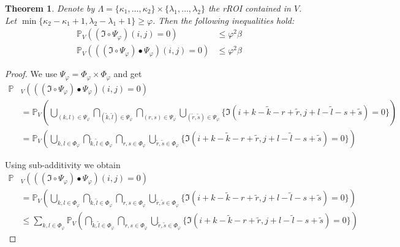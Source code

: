 \documentclass[a4paper,12pt]{article}
\theoremstyle{plain}
\newtheorem{theorem}{Theorem}[section]
\theoremstyle{definition}
\begin{document}
\begin{appendix}
\begin{theorem}
		Denote by $\varLambda = \{ \kappa_1, \dots, \kappa_2 \} \times \{ \lambda_1, \dots, \lambda_2 \}$ the rROI contained in $V$. Let $\min \{ \kappa_2 - \kappa_1 + 1, \lambda_2 - \lambda_1 + 1 \} \geq \varphi$.
		Then the following inequalities hold:
		\begin{align}
			\mathbb{P}_V( (\mathfrak{I} \circ \Psi_\varphi)(i, j) = 0 ) &\leq \varphi^2 \beta \label{ineqtypeIIopening} \\
			\mathbb{P}_V( ((\mathfrak{I} \circ \Psi_\varphi) \bullet \Psi_\varphi)(i, j) = 0 ) &\leq \varphi^2 \beta \label{ineqtypeIIclosing}
		\end{align}
	\end{theorem}
	\begin{proof}
		We use $\Psi_\varphi = \Phi_\varphi \times \Phi_\varphi$ and get
		\begin{align*}
			\mathbb{P}&_V( ((\mathfrak{I} \circ \Psi_\varphi) \bullet \Psi_\varphi)(i, j) = 0 ) \\
			&= \mathbb{P}_V\left( \bigcup_{(k, l) \in \Psi_\varphi} \bigcap_{(\tilde{k}, \tilde{l}) \in \Psi_\varphi} \bigcap_{(r, s) \in \Psi_\varphi} \bigcup_{(\tilde{r}, \tilde{s}) \in \Psi_\varphi} \{ \mathfrak{I}(i + k - \tilde{k} - r + \tilde{r}, j + l - \tilde{l} - s + \tilde{s}) = 0 \} \right) \\
			&= \mathbb{P}_V\left( \bigcup_{k, l \in \Phi_\varphi} \bigcap_{\tilde{k}, \tilde{l} \in \Phi_\varphi} \bigcap_{r, s \in \Phi_\varphi} \bigcup_{\tilde{r}, \tilde{s} \in \Phi_\varphi} \{ \mathfrak{I}(i + k - \tilde{k} - r + \tilde{r}, j + l - \tilde{l} - s + \tilde{s}) = 0 \} \right)
		\end{align*}
		
		Using sub-additivity we obtain
		\begin{align*}
			\mathbb{P}&_V( ((\mathfrak{I} \circ \Psi_\varphi) \bullet \Psi_\varphi)(i, j) = 0 ) \\
			&= \mathbb{P}_V\left( \bigcup_{k, l \in \Phi_\varphi} \bigcap_{\tilde{k}, \tilde{l} \in \Phi_\varphi} \bigcap_{r, s \in \Phi_\varphi} \bigcup_{\tilde{r}, \tilde{s} \in \Phi_\varphi} \{ \mathfrak{I}(i + k - \tilde{k} - r + \tilde{r}, j + l - \tilde{l} - s + \tilde{s}) = 0 \} \right) \\
			&\leq \sum_{k, l \in \Phi_\varphi} \mathbb{P}_V\left( \bigcap_{\tilde{k}, \tilde{l} \in \Phi_\varphi} \bigcap_{r, s \in \Phi_\varphi} \bigcup_{\tilde{r}, \tilde{s} \in \Phi_\varphi} \{ \mathfrak{I}(i + k - \tilde{k} - r + \tilde{r}, j + l - \tilde{l} - s + \tilde{s}) = 0 \} \right)
		\end{align*}
		

\end{proof}
\end{appendix}
\end{document}

